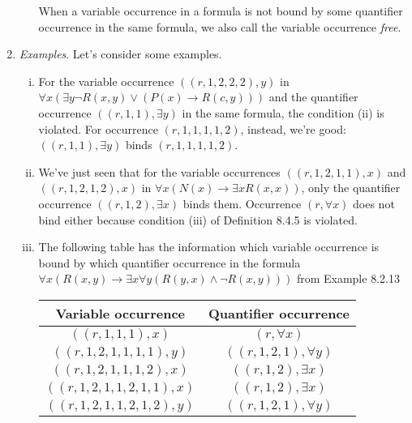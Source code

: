 \begin{enumerate}[\thesection.1]
\begin{itemize}
\begin{enumerate}[(i)]
\end{enumerate}
When a variable occurrence in a formula is not bound by some quantifier occurrence in the same formula, we also call the variable occurrence \emph{free}.

	\end{itemize}
	
	\item \emph{Examples}. Let's consider some examples.
	
		\begin{enumerate}[(i)]
		
			\item For the variable occurrence $((r,1,2,2,2), y)$ in $\forall x(\exists y \neg R(x,y)\lor (P(x)\to R(c,y)))$ and the quantifier occurrence $((r,1,1),\exists y)$ in the same formula, the condition (ii) is violated. For occurrence $(r,1,1,1,1,2)$, instead, we're good: $((r,1,1),\exists y)$ binds $(r,1,1,1,1,2)$. 
		
			\item We've just seen that for the variable occurrences $((r,1,2,1,1),x)$ and  $((r,1,2,1,2),x)$ in $\forall x(N(x)\to \exists xR(x,x))$, only the quantifier occurrence $((r,1,2),\exists x)$ binds them. Occurrence $(r,\forall x)$ does not bind either because condition (iii) of Definition 8.4.5 is violated. 
	
			\item The following table has the information which variable occurrence is bound by which quantifier occurrence in the formula $\forall x(R(x,y)\to \exists x\forall y(R(y,x)\land \neg R(x,y)))$ from Example 8.2.13
	
	\begin{center}
	\begin{tabular}{ c | c }
				Variable occurrence & Quantifier occurrence\\\hline
		
			$( ( r,1,1,1), x)$ & $( r, \forall x)$ \\
			$( ( r,1,2,1,1,1,1), y)$ & $( ( r,1,2,1), \forall y)$ \\
			$( ( r,1,2,1,1,1,2), x)$ & $( ( r,1,2), \exists x)$ \\
			$( ( r,1,2,1,1,2,1,1), x)$ & $( ( r,1,2), \exists x)$\\
			$( ( r,1,2,1,1,2,1,2), y)$ & $( ( r,1,2,1), \forall y)$\\
		
		\end{tabular}
		\end{center}
		

\end{enumerate}
\end{enumerate}
